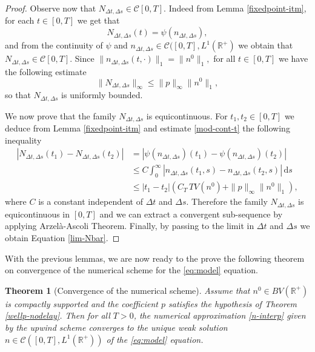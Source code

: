 \documentclass[11pt,a4paper]{article}
\newcommand{\R}{\mathbb{R}}
\newcommand{\dd}{\mathrm{d}}
\newtheorem{theorem}{Theorem}[section]
\begin{document}
\begin{proof}
    Observe now that $N_{\Delta t,\Delta s}\in\mathcal{C}[0,T]$. Indeed from Lemma \ref{fixedpoint-itm}, for each $t\in[0,T]$ we get that
\begin{equation*}
    N_{\Delta t,\Delta s}(t)=\psi(n_{\Delta t,\Delta s}),
 \end{equation*}
    and from the continuity of $\psi$ and $n_{\Delta t,\Delta s}\in\mathcal{C}([0,T],L^1(\R^+)$ we obtain that $N_{\Delta t,\Delta s}\in\mathcal{C}[0,T]$. Since $\|n_{\Delta t,\Delta s}(t,\cdot)\|_1=\|n^0\|_1,$ for all $t\in [0,T]$ we have the following estimate
 \begin{equation*}
    \|N_{\Delta t,\Delta s}\|_\infty\le \|p\|_\infty\|n^0\|_1,
 \end{equation*}
    so that $N_{\Delta t,\Delta s}$ is uniformly bounded.
    
    We now prove that the family $N_{\Delta t,\Delta s}$ is equicontinuous. For $t_1,t_2\in [0,T]$ we deduce from Lemma \eqref{fixedpoint-itm} and estimate \eqref{mod-cont-t} the following inequality
    \begin{equation*}
        \begin{split}
           \left|N_{\Delta t,\Delta s}(t_1)-N_{\Delta t,\Delta s}(t_2)\right|&=|\psi(n_{\Delta t,\Delta s})(t_1)-\psi(n_{\Delta t,\Delta s})(t_2)|\\
           &\le C\int_0^\infty|n_{\Delta t,\Delta s}(t_1,s)-n_{\Delta t,\Delta s}(t_2,s)|\,\dd s\\
           &\le |t_1-t_2|\left(C_T\,TV(n^0)+\|p\|_\infty\|n^0\|_1\right),
        \end{split}
    \end{equation*}
    where $C$ is a constant independent of $\Delta t$ and $\Delta s$. Therefore the family $N_{\Delta t,\Delta s}$ is equicontinuous in $[0,T]$ and we can extract a convergent sub-sequence by applying Arzelà-Ascoli Theorem. Finally, by passing to the limit in $\Delta t$ and $\Delta s$ we obtain Equation \eqref{lim-Nbar}.
\end{proof}

With the previous lemmas, we are now ready to the prove the following theorem on convergence of the numerical scheme for the \eqref{eq:model} equation.

\begin{theorem}[Convergence of the numerical scheme]
\label{conv-num}
Assume that $n^0\in BV(\R^+)$ is compactly supported and the coefficient $p$ satisfies the hypothesis of Theorem \ref{wellp-nodelay}. Then for all $T>0$, the numerical approximation \eqref{n-interp} given by the upwind scheme converges to the unique weak solution $n\in\mathcal{C}([0,T],L^1(\R^+))$ of the \eqref{eq:model} equation.
\end{theorem}
\end{document}
